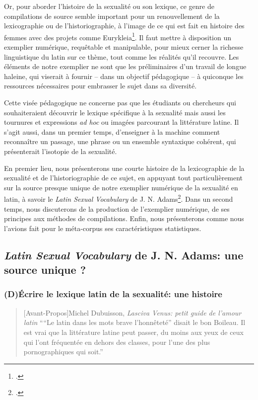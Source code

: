 Or, pour aborder l'histoire de la sexualité ou son lexique, ce genre de compilations de source semble important pour un renouvellement de la lexicographie ou de l'historiographie, à l'image de ce qui est fait en histoire des femmes avec des projets comme Eurykleia\footcite{noauthor_eurykleia_nodate}. Il faut mettre à disposition un exemplier numérique, requêtable et manipulable, pour mieux cerner la richesse linguistique du latin sur ce thème, tout comme les réalités qu'il recouvre. Les éléments de notre exemplier ne sont que les préliminaires d'un travail de longue haleine, qui viserait à fournir -- dans un objectif pédagogique -- à quiconque les ressources nécessaires pour embrasser le sujet dans sa diversité.

Cette visée pédagogique ne concerne pas que les étudiants ou chercheurs qui souhaiteraient découvrir le lexique spécifique à la sexualité mais aussi les tournures et expressions \textit{ad hoc} ou imagées parcourant la littérature latine. Il s'agit aussi, dans un premier temps, d'enseigner à la machine comment reconnaître un passage, une phrase ou un ensemble syntaxique cohérent, qui présenterait l'isotopie de la sexualité.

En premier lieu, nous présenterons une courte histoire de la lexicographie de la sexualité et de l'historiographie de ce sujet, en appuyant tout particulièrement sur la source presque unique de notre exemplier numérique de la sexualité en latin, à savoir le \textit{Latin Sexual Vocabulary} de J. N. Adams\footcite{adams}. Dans un second temps, nous discuterons de la production de l'exemplier numérique, de ses principes aux méthodes de compilations. Enfin, nous présenterons comme nous l'avions fait pour le méta-corpus ses caractéristiques statistiques.

\subsection{\textit{Latin Sexual Vocabulary} de J. N. Adams: une source unique ?}

\subsubsection{(D)Écrire le lexique latin de la sexualité: une histoire}

\begin{quote}[Avant-Propos]{Michel Dubuisson, \textit{Lasciva Venus: petit guide de l'amour latin}}
    \enquote{``Le latin dans les mots brave l'honnêteté'' disait le bon Boileau. Il est vrai que la littérature latine peut passer, du moins aux yeux de ceux qui l'ont fréquentée en dehors des classes, pour l'une des plus pornographiques qui soit.}
\end{quote}


